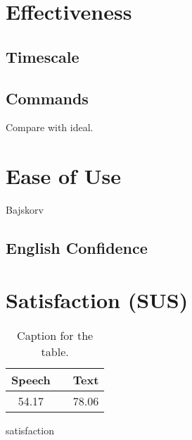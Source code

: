 \section{Effectiveness} 

\subsection{Timescale}

\subsection{Commands}
Compare with ideal.

\section{Ease of Use}
Bajskorv

\subsection{English Confidence}


\section{Satisfaction (SUS)}

\begin{table}[h!]
  \centering
  \label{tab:table1}
  \begin{tabular}{ccc}
    \toprule
    Speech &   & Text\\
    \midrule
    54.17 &   & 78.06\\
    \bottomrule
  \end{tabular}
  \caption{Caption for the table.}
\end{table}

satisfaction